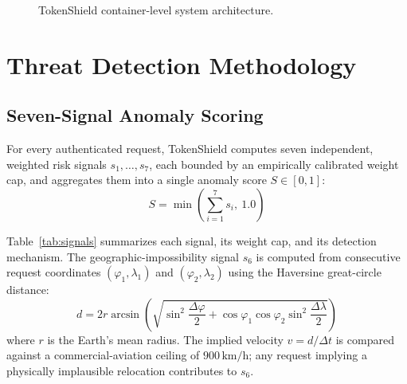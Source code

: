 \documentclass[conference]{IEEEtran}
\begin{document}
\begin{figure}[!htbp]
\caption{TokenShield container-level system architecture.}
\label{fig:arch}
\end{figure}

\section{Threat Detection Methodology}
\subsection{Seven-Signal Anomaly Scoring}
For every authenticated request, TokenShield computes seven independent, weighted risk signals $s_1, \dots, s_7$, each bounded by an empirically calibrated weight cap, and aggregates them into a single anomaly score $S \in [0, 1]$:
\begin{equation}
S = \min\left( \sum_{i=1}^{7} s_i, ~ 1.0 \right)
\label{eq:score}
\end{equation}

Table~\ref{tab:signals} summarizes each signal, its weight cap, and its detection mechanism. The geographic-impossibility signal $s_6$ is computed from consecutive request coordinates $(\varphi_1, \lambda_1)$ and $(\varphi_2, \lambda_2)$ using the Haversine great-circle distance:
\begin{equation}
d = 2r \arcsin \left( \sqrt{\sin^2 \frac{\Delta \varphi}{2} + \cos \varphi_1 \cos \varphi_2 \sin^2 \frac{\Delta \lambda}{2}} \right)
\label{eq:haversine}
\end{equation}
where $r$ is the Earth's mean radius. The implied velocity $v = d/\Delta t$ is compared against a commercial-aviation ceiling of $900\,\text{km/h}$; any request implying a physically implausible relocation contributes to $s_6$.
\end{document}
